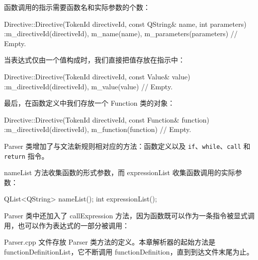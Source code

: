 函数调用的指示需要函数名和实际参数的个数：

\begin{codebox}
Directive::Directive(TokenId directiveId, const QString& name,
                     int parameters)
 :m_directiveId(directiveId),
  m_name(name),
  m_parameters(parameters) {
  // Empty.
}
\end{codebox}

当表达式仅由一个值构成时，我们直接把值存放在指示中：

\begin{codebox}
Directive::Directive(TokenId directiveId, const Value& value)
 :m_directiveId(directiveId),
  m_value(value) {
  // Empty.
}
\end{codebox}

最后，在函数定义中我们存放一个 Function 类的对象：

\begin{codebox}
Directive::Directive(TokenId directiveId,
                     const Function& function)
 :m_directiveId(directiveId),
  m_function(function) {
  // Empty.
}
\end{codebox}

Parser 类增加了与文法新规则相对应的方法：函数定义以及 \texttt{if}、\texttt{while}、\texttt{call} 和 \texttt{return} 指令。

\medskip{}

\begin{codebox}
// ...
class Parser {
  private:
    void functionDefinitionList();
    void functionDefinition();
\end{codebox}

nameList 方法收集函数的形式参数，而 expressionList 收集函数调用的实际参数：

\begin{codebox}
            QList<QString> nameList();
            int expressionList();
\end{codebox}

Parser 类中还加入了 callExpression 方法，因为函数既可以作为一条指令被显式调用，也可以作为表达式的一部分被调用：

\begin{codebox}
    void callExpression();
    // ...
};
\end{codebox}

Parser.cpp 文件存放 Parser 类方法的定义。本章解析器的起始方法是 functionDefinitionList，它不断调用 functionDefinition，直到到达文件末尾为止。

\medskip{}

